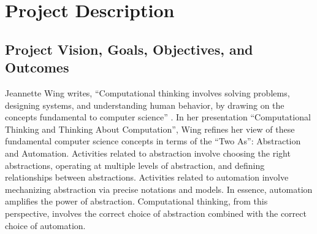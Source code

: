 
\renewcommand{\thepage} {C--\arabic{page}}

\renewcommand{\thesection} {C.\arabic{section}}
\setcounter{section}{0}

\section{Project Description}

\subsection{Project Vision, Goals, Objectives, and Outcomes}



Jeannette Wing writes, ``Computational thinking involves solving problems,
designing systems, and understanding human behavior, by drawing on the
concepts fundamental to computer science'' \citep{Wing06}.  In her
presentation ``Computational Thinking and Thinking About Computation'',
Wing refines her view of these fundamental computer science concepts in
terms of the ``Two As'': Abstraction and Automation.  Activities related to
abstraction involve choosing the right abstractions, operating at multiple
levels of abstraction, and defining relationships between abstractions.
Activities related to automation involve mechanizing abstraction via
precise notations and models.  In essence, automation amplifies the power
of abstraction.  Computational thinking, from this perspective, involves
the correct choice of abstraction combined with the correct choice of
automation.

